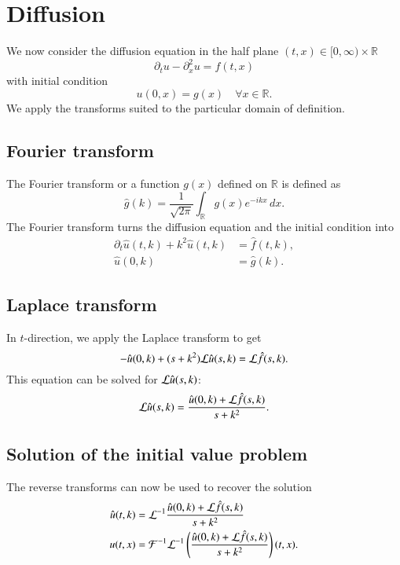 %
%
%
\section{Diffusion}
We now consider the diffusion equation in the half plane
$(t,x)\in[0,\infty)\times \mathbb R$
\[
\partial_tu-\partial_x^2u=f(t,x)
\]
with initial condition
\[
u(0,x)=g(x)\quad \forall x\in\mathbb R.
\]
We apply the transforms suited to the particular domain of definition.

\subsection{Fourier transform}
The Fourier transform or a function $g(x)$ defined on $\mathbb R$ is
defined as
\[
\hat g(k)=\frac1{\sqrt{2\pi}}\int_{\mathbb R}g(x)e^{-ikx}\,dx.
\]
The Fourier transform turns the diffusion equation and the initial
condition into
\begin{align*}
\partial_t \hat u(t,k)+k^2\hat u(t,k)&=\hat f(t,k),\\
\hat u(0,k)&=\hat g(k).
\end{align*}

\subsection{Laplace transform}
In $t$-direction, we apply the Laplace transform to get
\[
-\hat u(0,k)+(s+k^2){\cal L}\hat u(s,k)={\cal L}\hat f(s,k).
\]
This equation can be solved for ${\cal L}\hat u(s,k)$:
\[
{\cal L}\hat u(s,k)=\frac{\hat u(0,k)+{\cal L}\hat f(s,k)}{s+k^2}.
\]

\subsection{Solution of the initial value problem}
The reverse transforms can now be used to recover the solution
\begin{align*}
\hat u(t,k)&={\cal L}^{-1}
\frac{\hat u(0,k)+{\cal L}\hat f(s,k)}{s+k^2}
\\
u(t,x)&={\cal F}^{-1}{\cal L}^{-1}
\left(\frac{\hat u(0,k)+{\cal L}\hat f(s,k)}{s+k^2}\right)(t,x).
\end{align*}

